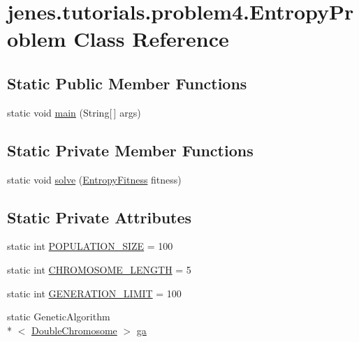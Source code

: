 \hypertarget{classjenes_1_1tutorials_1_1problem4_1_1_entropy_problem}{\section{jenes.\-tutorials.\-problem4.\-Entropy\-Problem Class Reference}
\label{classjenes_1_1tutorials_1_1problem4_1_1_entropy_problem}
}
\subsection*{Static Public Member Functions}
\begin{DoxyCompactItemize}
\item 
static void \hyperlink{classjenes_1_1tutorials_1_1problem4_1_1_entropy_problem_a9b806aeb673e0324764205d27487524f}{main} (String\mbox{[}$\,$\mbox{]} args)
\end{DoxyCompactItemize}
\subsection*{Static Private Member Functions}
\begin{DoxyCompactItemize}
\item 
static void \hyperlink{classjenes_1_1tutorials_1_1problem4_1_1_entropy_problem_a648c39e968526918af351a0fe7acd8a9}{solve} (\hyperlink{classjenes_1_1tutorials_1_1problem4_1_1_entropy_fitness}{Entropy\-Fitness} fitness)
\end{DoxyCompactItemize}
\subsection*{Static Private Attributes}
\begin{DoxyCompactItemize}
\item 
static int \hyperlink{classjenes_1_1tutorials_1_1problem4_1_1_entropy_problem_a7827e623f64bde3d796783fd44f61ec2}{P\-O\-P\-U\-L\-A\-T\-I\-O\-N\-\_\-\-S\-I\-Z\-E} = 100
\item 
static int \hyperlink{classjenes_1_1tutorials_1_1problem4_1_1_entropy_problem_a9700005f7e7502f49041cd0930d475a4}{C\-H\-R\-O\-M\-O\-S\-O\-M\-E\-\_\-\-L\-E\-N\-G\-T\-H} = 5
\item 
static int \hyperlink{classjenes_1_1tutorials_1_1problem4_1_1_entropy_problem_a41ed3f20ee8c44e6351abec3c1e21a0c}{G\-E\-N\-E\-R\-A\-T\-I\-O\-N\-\_\-\-L\-I\-M\-I\-T} = 100
\item 
static Genetic\-Algorithm\\*
$<$ \hyperlink{classjenes_1_1chromosome_1_1_double_chromosome}{Double\-Chromosome} $>$ \hyperlink{classjenes_1_1tutorials_1_1problem4_1_1_entropy_problem_a50c93eb6b1379adf70e9f6fa7431936c}{ga}
\end{DoxyCompactItemize}


